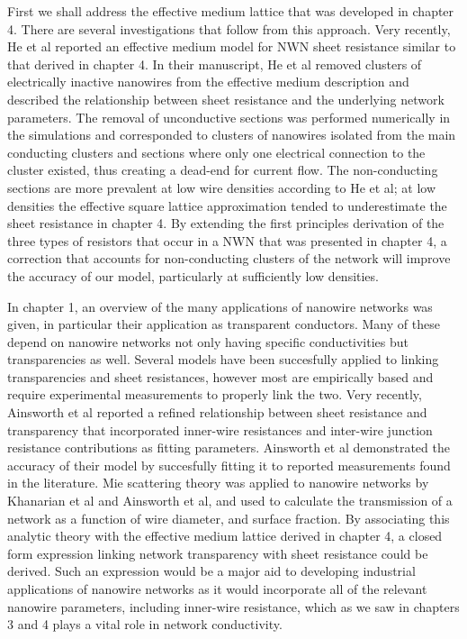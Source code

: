 First we shall address the effective medium lattice that was developed in chapter 4. There are several investigations that follow from this approach. Very recently, He et al reported an effective medium model for NWN sheet resistance\cite{he2018} similar to that derived in chapter 4. In their manuscript, He et al removed clusters of electrically inactive nanowires from the effective medium description and described the relationship between sheet resistance and the underlying network parameters. The removal of unconductive sections was performed numerically in the simulations and corresponded to clusters of nanowires isolated from the main conducting clusters and sections where only one electrical connection to the cluster existed, thus creating a dead-end for current flow. The non-conducting sections are more prevalent at low wire densities according to He et al; at low densities the effective square lattice approximation tended to underestimate the sheet resistance in chapter 4. By extending the first principles derivation of the three types of resistors that occur in a NWN that was presented in chapter 4, a correction that accounts for non-conducting clusters of the network will improve the accuracy of our model, particularly at sufficiently low densities.

In chapter 1, an overview of the many applications of nanowire networks was given, in particular their application as transparent conductors. Many of these depend on nanowire networks not only having specific conductivities but transparencies as well. Several models have been succesfully applied to linking transparencies and sheet resistances, however most are empirically based and require experimental measurements to properly link the two\cite{chung2012,selzer2016,bergin2012,mutiso2013}. Very recently, Ainsworth et al\cite{ainsworth2018} reported a refined relationship between sheet resistance and transparency that incorporated inner-wire resistances and inter-wire junction resistance contributions as fitting parameters. Ainsworth et al demonstrated the accuracy of their model by succesfully fitting it to reported measurements found in the literature\cite{ainsworth2018}. Mie scattering theory was applied to nanowire networks by Khanarian et al\cite{khanarian2013} and Ainsworth et al\cite{ainsworth2018}, and used to calculate the transmission of a network as a function of wire diameter, and surface fraction. By associating this analytic theory with the effective medium lattice derived in chapter 4, a closed form expression linking network transparency with sheet resistance could be derived. Such an expression would be a major aid to developing industrial applications of nanowire networks as it would incorporate all of the relevant nanowire parameters, including inner-wire resistance, which as we saw in chapters 3 and 4 plays a vital role in network conductivity.

